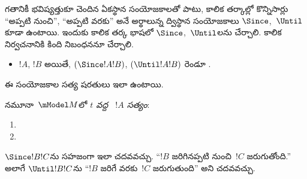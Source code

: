 \documentclass[../../../include/open-logic-section]{subfiles}
\begin{document}


గతానికీ భవిష్యత్తుకూ చెందిన ఏకస్థాన సంయోజకాలతో పాటు,
కాలిక తర్కాల్లో కొన్నిసార్లు ``అప్పటి నుంచి'',
``అప్పటి వరకు'' అనే అర్థాలున్న ద్విస్థాన సంయోజకాలు
$\Since $,~$\Until$ కూడా ఉంటాయి. ఇందుకు కాలిక తర్క
భాషలో $\Since $,~$\Until$లను చేర్చాలి. కాలిక
 నిర్వచనానికి కింది
నిబంధననూ చేర్చాలి.

\begin{itemize}
\item[] $!A$, $!B$ 
  అయితే, $(\Since  !A !B)$, $(\Until !A !B)$ రెండూ
  .
\end{itemize}

ఈ సంయోజకాల సత్య షరతులు ఇలా ఉంటాయి.

\begin{defn}
  నమూనా~$\mModel M$లో \emph{$t$ వద్ద
  ~$!A$ సత్యం}:
  \begin{enumerate}
  \item{} 
   \item{} 
  \end{enumerate}
\end{defn}

$\Since !B !C$ను సహజంగా ఇలా చదవవచ్చు. ``$!B$ జరిగినప్పటి
నుంచి~$!C$ జరుగుతోంది.'' అలాగే $\Until !B !C$ను
``$!B$ జరిగే వరకు~$!C$ జరుగుతుంది'' అని చదవవచ్చు.
\end{document}
